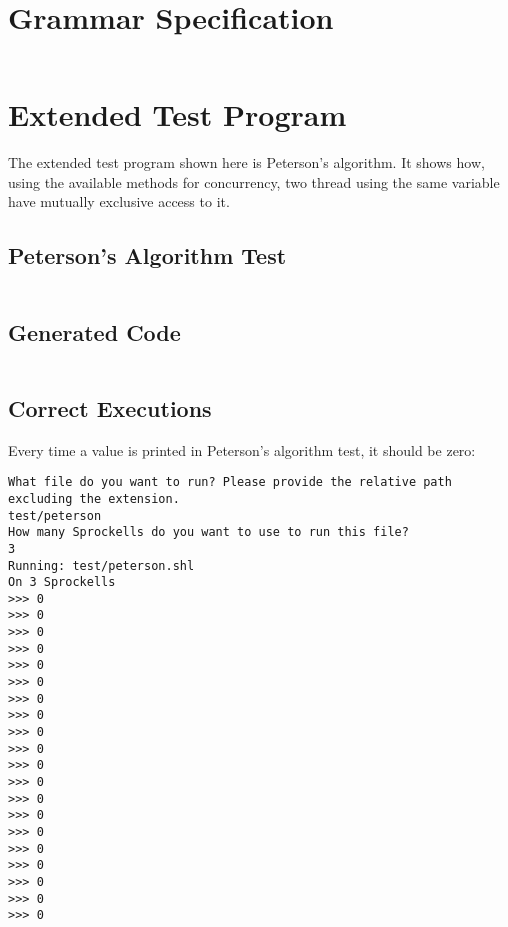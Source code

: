 \documentclass[twoside]{report}
\begin{document}
\begin{appendices}
\label{appendices}


\chapter{Grammar Specification}
\label{grammar_specification}
\begin{landscape}
\inputminted[firstline=66, lastline=138, tabsize=4]{haskell}{../Grammar.hs}
\end{landscape}


\chapter{Extended Test Program}
\label{extended_test_program}
The extended test program shown here is Peterson's algorithm. It shows how, using the available methods for concurrency, two thread using the same variable have mutually exclusive access to it.

\section{Peterson's Algorithm Test}
\inputminted[tabsize=4,linenos,firstnumber=1]{text}{../test/peterson.shl}

\section{Generated Code}
\inputminted[tabsize=4,linenos,firstnumber=0]{text}{../test/peterson_gen.txt}

\section{Correct Executions}
Every time a value is printed in Peterson's algorithm test, it should be zero:
\begin{verbatim}
What file do you want to run? Please provide the relative path excluding the extension.
test/peterson
How many Sprockells do you want to use to run this file?
3
Running: test/peterson.shl
On 3 Sprockells
>>> 0
>>> 0
>>> 0
>>> 0
>>> 0
>>> 0
>>> 0
>>> 0
>>> 0
>>> 0
>>> 0
>>> 0
>>> 0
>>> 0
>>> 0
>>> 0
>>> 0
>>> 0
>>> 0
>>> 0
\end{verbatim}


\end{appendices}
\end{document}

